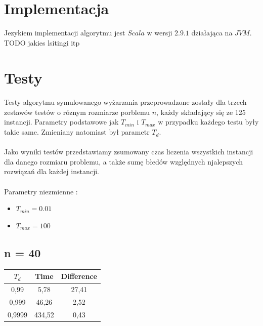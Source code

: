 \documentclass[wide,a4paper,titlepage,12pt] {article}
\begin{document}
\section{Implementacja}
Jezykiem implementacji algorytmu jest $Scala$ w wersji $2.9.1$ działająca na $JVM$. \\
TODO jakies lsitingi itp
\section{Testy}
\paragraph{}
Testy algorytmu symulowanego wyżarzania przeprowadzone zostały dla trzech zestawów testów o róznym rozmiarze porblemu $n$, każdy składający się ze 125 instancji. Parametry podstawowe jak $T_{min}$ i $T_{max}$ w przypadku każdego testu były takie same. Zmieniany natomiast był parametr $T_{d}$.
\paragraph{}
Jako wyniki testów przedstawiamy zsumowany czas liczenia wszystkich instancji dla danego rozmiaru problemu, a także sumę błedów względnych njalepszych rozwiązań dla każdej instancji. 
\paragraph{}
Parametry niezmienne : 
\begin{itemize}
  \item $T_{min} = 0.01$
  \item $T_{max} = 100$
\end{itemize}
\newpage
\subsection{n = 40}
\begin{center}
    \begin{tabular}{|c|c|c|}
      \hline
       $T_{d}$ & Time & Difference \\ \hline
       0,99 & 5,78 & 27,41 \\ \hline
       0,999 & 46,26 & 2,52 \\ \hline
       0,9999 & 434,52 & 0,43 \\ \hline
  \end{tabular}
\end{center}
\end{document}
